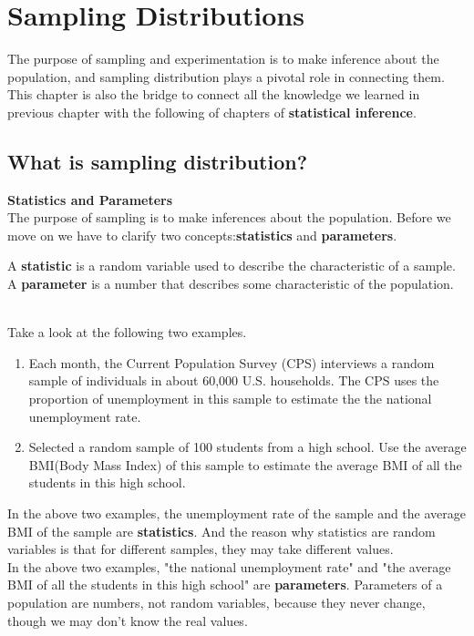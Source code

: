 \documentclass[a4paper, 12pt,twoside]{book}
\begin{document}
\pagestyle{fancy}
\fancyhf{}
\renewcommand{\chaptermark}[1]{ \markboth{#1}{} }
\fancyhead[CE,CO]{\leftmark}
\fancyfoot[LE,RO]{\thepage}

\chapter{Sampling Distributions}
The purpose of sampling and experimentation is to make inference about the population, and sampling distribution plays a pivotal role in connecting them. This chapter is also the bridge to connect all the knowledge we learned in previous chapter with the following of chapters of \textbf{statistical inference}.
\newpage
\section{What is sampling distribution?}
\textbf{Statistics and Parameters}\vspace{0.3cm}\\
The purpose of sampling is to make inferences about the population. Before we move on we have to clarify two concepts:\textbf{statistics} and \textbf{parameters}.\vspace{0.3cm}\\
   \colorbox{babypink}{\parbox{\textwidth}{
   A \textbf{statistic} is a random variable used to describe the characteristic of a sample.\vspace{0.3cm}\\
A \textbf{parameter} is a number that describes some characteristic of the population.\\
   }}
\vspace{0.6cm}\\
Take a look at the following two examples.
    \begin{enumerate}[(1)]
        \item Each month, the Current Population Survey (CPS) interviews a random sample of individuals in about 60,000 U.S. households. The CPS uses the proportion of unemployment in this sample to estimate the the national unemployment rate.
        \item Selected a random sample of 100 students from a high school. Use the average BMI(Body Mass Index) of this sample to estimate the average BMI of all the students in this high school.
    \end{enumerate}
In the above two examples, the unemployment rate of the sample and the average BMI of the sample are  \textbf{statistics}. And the reason why statistics are random variables is that for different samples, they may take different values.\vspace{0.3cm}\\
In the above two examples, "the national unemployment rate" and "the average BMI of all the students in this high school" are \textbf{parameters}. Parameters of a population are numbers, not random variables, because they never change, though we may don't know the real values.\vspace{0.3cm}\\
\end{document}
